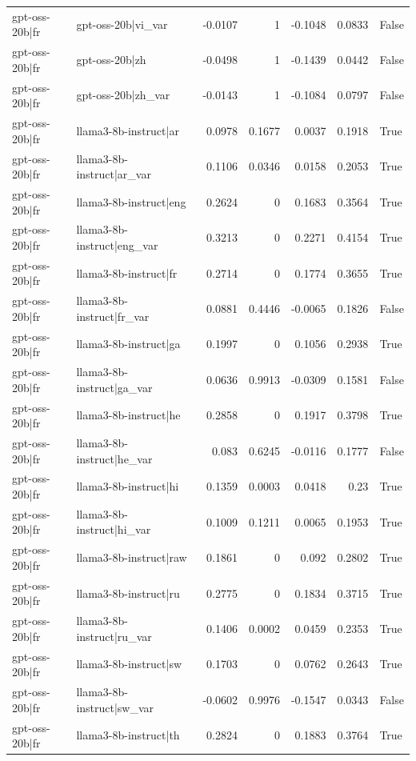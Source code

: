 \begin{table}
\begin{tabular}{l l r r r r l}
gpt-oss-20b|fr & gpt-oss-20b|vi_var & -0.0107 & 1 & -0.1048 & 0.0833 & False \\
gpt-oss-20b|fr & gpt-oss-20b|zh & -0.0498 & 1 & -0.1439 & 0.0442 & False \\
gpt-oss-20b|fr & gpt-oss-20b|zh_var & -0.0143 & 1 & -0.1084 & 0.0797 & False \\
gpt-oss-20b|fr & llama3-8b-instruct|ar & 0.0978 & 0.1677 & 0.0037 & 0.1918 & True \\
gpt-oss-20b|fr & llama3-8b-instruct|ar_var & 0.1106 & 0.0346 & 0.0158 & 0.2053 & True \\
gpt-oss-20b|fr & llama3-8b-instruct|eng & 0.2624 & 0 & 0.1683 & 0.3564 & True \\
gpt-oss-20b|fr & llama3-8b-instruct|eng_var & 0.3213 & 0 & 0.2271 & 0.4154 & True \\
gpt-oss-20b|fr & llama3-8b-instruct|fr & 0.2714 & 0 & 0.1774 & 0.3655 & True \\
gpt-oss-20b|fr & llama3-8b-instruct|fr_var & 0.0881 & 0.4446 & -0.0065 & 0.1826 & False \\
gpt-oss-20b|fr & llama3-8b-instruct|ga & 0.1997 & 0 & 0.1056 & 0.2938 & True \\
gpt-oss-20b|fr & llama3-8b-instruct|ga_var & 0.0636 & 0.9913 & -0.0309 & 0.1581 & False \\
gpt-oss-20b|fr & llama3-8b-instruct|he & 0.2858 & 0 & 0.1917 & 0.3798 & True \\
gpt-oss-20b|fr & llama3-8b-instruct|he_var & 0.083 & 0.6245 & -0.0116 & 0.1777 & False \\
gpt-oss-20b|fr & llama3-8b-instruct|hi & 0.1359 & 0.0003 & 0.0418 & 0.23 & True \\
gpt-oss-20b|fr & llama3-8b-instruct|hi_var & 0.1009 & 0.1211 & 0.0065 & 0.1953 & True \\
gpt-oss-20b|fr & llama3-8b-instruct|raw & 0.1861 & 0 & 0.092 & 0.2802 & True \\
gpt-oss-20b|fr & llama3-8b-instruct|ru & 0.2775 & 0 & 0.1834 & 0.3715 & True \\
gpt-oss-20b|fr & llama3-8b-instruct|ru_var & 0.1406 & 0.0002 & 0.0459 & 0.2353 & True \\
gpt-oss-20b|fr & llama3-8b-instruct|sw & 0.1703 & 0 & 0.0762 & 0.2643 & True \\
gpt-oss-20b|fr & llama3-8b-instruct|sw_var & -0.0602 & 0.9976 & -0.1547 & 0.0343 & False \\
gpt-oss-20b|fr & llama3-8b-instruct|th & 0.2824 & 0 & 0.1883 & 0.3764 & True \\

\end{tabular}
\end{table}
